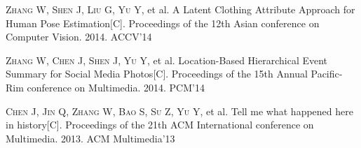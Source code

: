 
\begin{publications}{99}

    \item\textsc{Zhang W, Shen J, Liu G, Yu Y}, et al. {A Latent Clothing Attribute Approach for Human Pose Estimation}[C].
      Proceedings of the 12th Asian conference on Computer Vision. 2014. ACCV'14

    \item\textsc{Zhang W, Chen J, Shen J, Yu Y}, et al. {Location-Based Hierarchical Event Summary for Social Media Photos}[C].
      Proceedings of the 15th Annual Pacific-Rim conference on Multimedia. 2014. PCM'14

    \item\textsc{Chen J, Jin Q, Zhang W, Bao S, Su Z, Yu Y}, et al. {Tell me what happened here in history}[C].
      Proceedings of the 21th ACM International conference on Multimedia. 2013. ACM Multimedia'13

\end{publications} 